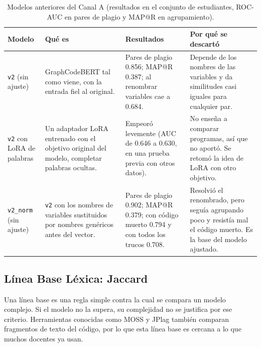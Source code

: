 \begin{table}[H]
    \centering
    \caption{Modelos anteriores del Canal A (resultados en el conjunto de estudiantes, ROC-AUC en pares de plagio y MAP@R en agrupamiento).}
    \label{tab:modelos_anteriores}
    \renewcommand{\arraystretch}{1.2}
    \small
    \begin{tabularx}{\textwidth}{|>{\raggedright\arraybackslash}p{2.7cm}|>{\raggedright\arraybackslash}X|>{\raggedright\arraybackslash}X|>{\raggedright\arraybackslash}X|}
        \hline
        \textbf{Modelo} & \textbf{Qué es} & \textbf{Resultados} & \textbf{Por qué se descartó} \\ \hline
        \texttt{v2} (sin ajuste) & GraphCodeBERT tal como viene, con la entrada fiel al original. & Pares de plagio 0.856; MAP@R 0.387; al renombrar variables cae a 0.684. & Depende de los nombres de las variables y da similitudes casi iguales para cualquier par. \\ \hline
        \texttt{v2} con LoRA de palabras & Un adaptador LoRA \cite{Hu2022LoRA} entrenado con el objetivo original del modelo, completar palabras ocultas. & Empeoró levemente (AUC de 0.646 a 0.630, en una prueba previa con otros datos). & No enseña a comparar programas, así que no aportó. Se retomó la idea de LoRA con otro objetivo. \\ \hline
        \texttt{v2\_norm} (sin ajuste) & \texttt{v2} con los nombres de variables sustituidos por nombres genéricos antes del vector. & Pares de plagio 0.902; MAP@R 0.379; con código muerto 0.794 y con todos los trucos 0.708. & Resolvió el renombrado, pero seguía agrupando poco y resistía mal el código muerto. Es la base del modelo ajustado. \\ \hline
    \end{tabularx}
\end{table}

\subsection{Línea Base Léxica: Jaccard}
\label{subsec:linea_base_lexica}

Una línea base es una regla simple contra la cual se compara un modelo complejo. Si el modelo no la supera, su complejidad no se justifica por ese criterio. Herramientas conocidas como MOSS \cite{AikenMOSS} y JPlag \cite{PrecheltJPlag} también comparan fragmentos de texto del código, por lo que esta línea base es cercana a lo que muchos docentes ya usan.


